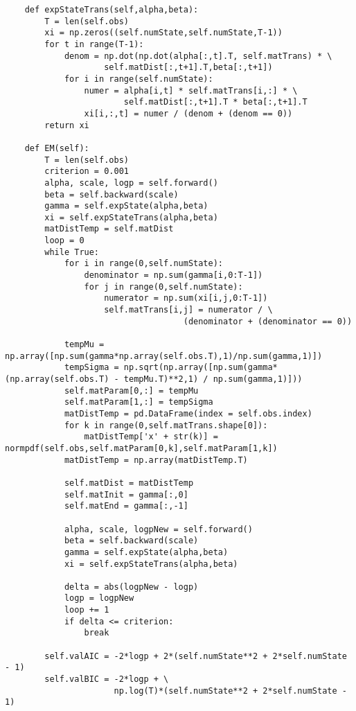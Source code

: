\begin{spacing}{1.2}
\begin{lstlisting}
    def expStateTrans(self,alpha,beta):
        T = len(self.obs)
        xi = np.zeros((self.numState,self.numState,T-1))   
        for t in range(T-1):
            denom = np.dot(np.dot(alpha[:,t].T, self.matTrans) * \
                    self.matDist[:,t+1].T,beta[:,t+1])
            for i in range(self.numState):
                numer = alpha[i,t] * self.matTrans[i,:] * \
                        self.matDist[:,t+1].T * beta[:,t+1].T
                xi[i,:,t] = numer / (denom + (denom == 0))
        return xi
        
    def EM(self):
        T = len(self.obs)
        criterion = 0.001
        alpha, scale, logp = self.forward()
        beta = self.backward(scale)            
        gamma = self.expState(alpha,beta)    
        xi = self.expStateTrans(alpha,beta)
        matDistTemp = self.matDist
        loop = 0
        while True:
            for i in range(0,self.numState):
                denominator = np.sum(gamma[i,0:T-1])
                for j in range(0,self.numState): 
                    numerator = np.sum(xi[i,j,0:T-1])
                    self.matTrans[i,j] = numerator / \
                                    (denominator + (denominator == 0))
            
            tempMu = np.array([np.sum(gamma*np.array(self.obs.T),1)/np.sum(gamma,1)])
            tempSigma = np.sqrt(np.array([np.sum(gamma*(np.array(self.obs.T) - tempMu.T)**2,1) / np.sum(gamma,1)]))
            self.matParam[0,:] = tempMu
            self.matParam[1,:] = tempSigma
            matDistTemp = pd.DataFrame(index = self.obs.index)
            for k in range(0,self.matTrans.shape[0]):
                matDistTemp['x' + str(k)] = normpdf(self.obs,self.matParam[0,k],self.matParam[1,k])
            matDistTemp = np.array(matDistTemp.T)
            
            self.matDist = matDistTemp
            self.matInit = gamma[:,0]
            self.matEnd = gamma[:,-1]
            
            alpha, scale, logpNew = self.forward()
            beta = self.backward(scale)            
            gamma = self.expState(alpha,beta)    
            xi = self.expStateTrans(alpha,beta)
            
            delta = abs(logpNew - logp)
            logp = logpNew
            loop += 1
            if delta <= criterion:
                break
        
        self.valAIC = -2*logp + 2*(self.numState**2 + 2*self.numState - 1)
        self.valBIC = -2*logp + \
                      np.log(T)*(self.numState**2 + 2*self.numState - 1)
                

\end{lstlisting}
\end{spacing}
